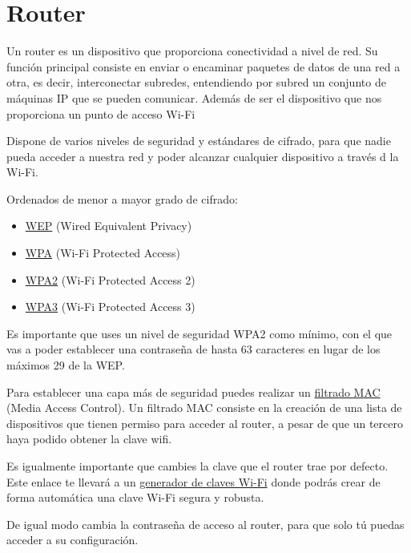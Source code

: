 \documentclass[
  a4paper,
  openany]{book}
\providecommand{\tightlist}{%
  \setlength{\itemsep}{0pt}\setlength{\parskip}{0pt}}
\begin{document}
\hypertarget{router}{%
\section{Router}\label{router}}

Un router es un dispositivo que proporciona conectividad a nivel de red. Su función principal consiste en enviar o encaminar paquetes de datos de una red a otra, es decir, interconectar subredes, entendiendo por subred un conjunto de máquinas IP que se pueden comunicar. Además de ser el dispositivo que nos proporciona un punto de acceso Wi-Fi

Dispone de varios niveles de seguridad y estándares de cifrado, para que nadie pueda acceder a nuestra red y poder alcanzar cualquier dispositivo a través d la Wi-Fi.

Ordenados de menor a mayor grado de cifrado:

\begin{itemize}
\tightlist
\item
  \href{https://es.wikipedia.org/wiki/Wired_Equivalent_Privacy}{WEP} (Wired Equivalent Privacy)
\item
  \href{https://es.wikipedia.org/wiki/Wi-Fi_Protected_Access}{WPA} (Wi-Fi Protected Access)
\item
  \href{https://es.wikipedia.org/wiki/WPA2}{WPA2} (Wi-Fi Protected Access 2)
\item
  \href{https://es.wikipedia.org/wiki/WPA3}{WPA3} (Wi-Fi Protected Access 3)
\end{itemize}

Es importante que uses un nivel de seguridad WPA2 como mínimo, con el que vas a poder establecer una contraseña de hasta 63 caracteres en lugar de los máximos 29 de la WEP.

Para establecer una capa más de seguridad puedes realizar un \href{https://es.wikipedia.org/wiki/Filtrado_MAC}{filtrado MAC} (Media Access Control). Un filtrado MAC consiste en la creación de una lista de dispositivos que tienen permiso para acceder al router, a pesar de que un tercero haya podido obtener la clave wifi.

Es igualmente importante que cambies la clave que el router trae por defecto. Este enlace te llevará a un \href{https://bandaancha.eu/generador-claves-wifi}{generador de claves Wi-Fi} donde podrás crear de forma automática una clave Wi-Fi segura y robusta.

De igual modo cambia la contraseña de acceso al router, para que solo tú puedas acceder a su configuración.
\end{document}
